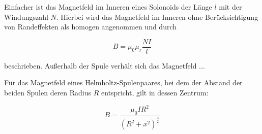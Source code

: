 Einfacher ist das Magnetfeld im Inneren eines Solonoids der Länge $l$ 
mit der Windungszahl $N$. Hierbei wird das Magnetfeld im Inneren ohne
Berücksichtigung von Randeffekten als homogen angenommen und durch 

\begin{equation}
    B = \mu_0 \mu_r \frac{NI}l 
\end{equation}

beschrieben. Außerhalb der Spule verhält sich das Magnetfeld ...

Für das Magnetfeld eines Helmholtz-Spulenpaares, bei dem der Abstand der beiden 
Spulen deren Radius $R$ entspricht, gilt in dessen Zentrum:

\begin{equation}
    B = \frac{\mu_0 I R^2}{({R^2}+{x^2})^\frac{3}2}
\end{equation}


